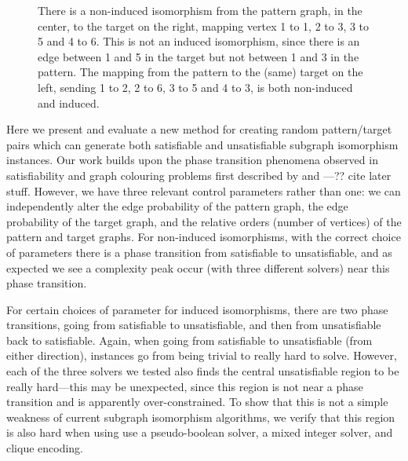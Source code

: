 \documentclass[letterpaper]{article}
\begin{document}
\begin{figure}[b]

    \caption{There is a non-induced isomorphism from the pattern graph, in the center, to the target
    on the right, mapping vertex 1 to 1, 2 to 3, 3 to 5 and 4 to 6. This is not an induced
    isomorphism, since there is an edge between 1 and 5 in the target but not between 1 and 3 in the
    pattern. The mapping from the pattern to the (same) target on the left, sending 1 to 2, 2 to 6, 3 to
    5 and 4 to 3, is both non-induced and induced.}
    \label{figure:sip}
\end{figure}

Here we present and evaluate a new method for creating random pattern/target pairs which can
generate both satisfiable and unsatisfiable subgraph isomorphism instances. Our work builds upon the
phase transition phenomena observed in satisfiability and graph colouring problems first described
by \citet{Cheeseman:1991} and \citet{Mitchell:1992}---?? cite later stuff. However, we have three
relevant control parameters rather than one: we can independently alter the edge probability of the pattern
graph, the edge probability of the target graph, and the relative orders (number of vertices) of the pattern
and target graphs.  For non-induced isomorphisms, with the correct choice of parameters there is a
phase transition from satisfiable to unsatisfiable, and as expected we see a complexity peak occur
(with three different solvers) near this phase transition.

For certain choices of parameter for induced isomorphisms, there are two phase transitions, going
from satisfiable to unsatisfiable, and then from unsatisfiable back to satisfiable. Again, when
going from satisfiable to unsatisfiable (from either direction), instances go from being trivial to
really hard to solve. However, each of the three solvers we tested also finds the central
unsatisfiable region to be really hard---this may be unexpected, since this region is not near a
phase transition and is apparently over-constrained. To show that this is not a simple weakness of
current subgraph isomorphism algorithms, we verify that this region is also hard when using use a
pseudo-boolean solver, a mixed integer solver, and clique encoding.
\end{document}
